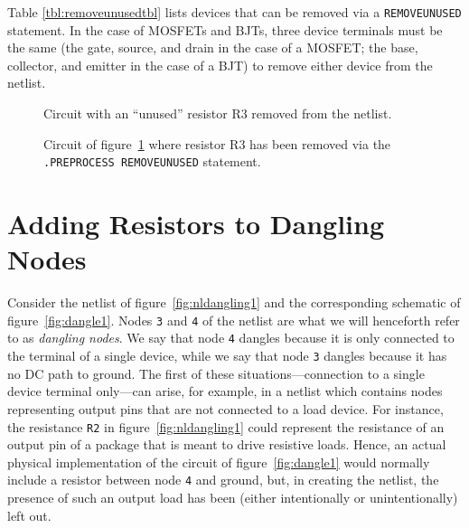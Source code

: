 Table \ref{tbl:removeunusedtbl} lists devices that can be removed via a \texttt{REMOVEUNUSED} 
statement.  In the case of MOSFETs and BJTs, three device terminals must be the same (the gate, source,
and drain in the case of a MOSFET; the base, collector, and emitter in the
case of a BJT) to remove either device from the netlist.

\begin{figure}[htbp]
\begin{centering}
\caption{Circuit with an ``unused'' resistor R3 removed from the 
netlist.}
\label{fig:nlunused2}
\end{centering}
\end{figure}

\begin{figure}[h]
\centering{}
\caption[Circuit of figure\ \ref{fig:nlunused2}.] {Circuit of figure\ \ref{fig:nlunused2} where resistor R3 has been removed via the \texttt{.PREPROCESS REMOVEUNUSED} statement.} 
\label{fig:unused2}
\end{figure}





\section{Adding Resistors to Dangling Nodes}
\label{PP_dangling}
Consider the netlist of figure\ \ref{fig:nldangling1} and the corresponding
schematic of figure\ \ref{fig:dangle1}.  Nodes \texttt{3} and \texttt{4} of the 
netlist are what we will henceforth refer to as {\em dangling nodes}.  We say
that node \texttt{4} dangles because it is only connected to the terminal of a
single device, while we say that node \texttt{3} dangles because it has no DC
path to ground.  The first of these situations---connection to a single 
device terminal only---can arise, for example, in a netlist which contains 
nodes representing output pins that are not connected to a load device.  For 
instance, the resistance \texttt{R2} in figure\ \ref{fig:nldangling1} could 
represent the resistance of an output pin of a package that is meant to drive 
resistive loads.  Hence, an actual physical implementation of the circuit of 
figure\ \ref{fig:dangle1} would normally include a resistor between node \texttt{4} 
and ground, but, in creating the netlist, the presence of such an output load 
has been (either intentionally or unintentionally) left out.

